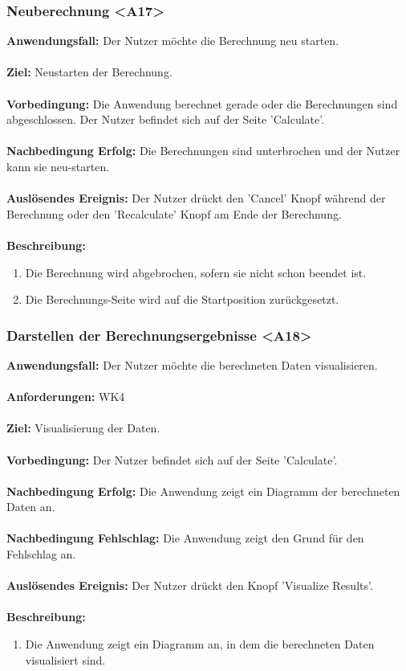 \documentclass[parskip=full]{scrartcl} %
\begin{document}
\subsubsection*{Neuberechnung <A17>}
\textbf{Anwendungsfall:}  Der Nutzer möchte die Berechnung neu starten.\\\\
\textbf{Ziel:} Neustarten der Berechnung.\\\\
\textbf{Vorbedingung:} Die Anwendung berechnet gerade oder die Berechnungen sind abgeschlossen. Der Nutzer befindet sich auf der Seite 'Calculate'.\\\\
\textbf{Nachbedingung Erfolg:} Die Berechnungen sind unterbrochen und der Nutzer kann sie neu-starten.\\\\
\textbf{Auslösendes Ereignis:} Der Nutzer drückt den 'Cancel' Knopf während der Berechnung oder den 'Recalculate' Knopf am Ende der Berechnung.\\\\
\textbf{Beschreibung:}
\begin{enumerate}
    \item Die Berechnung wird abgebrochen, sofern sie nicht schon beendet ist.
    \item Die Berechnungs-Seite wird auf die Startposition zurückgesetzt.
\end{enumerate}
\newpage



\subsubsection*{Darstellen der Berechnungsergebnisse <A18>}
\textbf{Anwendungsfall:} Der Nutzer möchte die berechneten Daten visualisieren.\\\\
\textbf{Anforderungen:} WK4\\\\
\textbf{Ziel:} Visualisierung der Daten.\\\\
\textbf{Vorbedingung:}  Der Nutzer befindet sich auf der Seite 'Calculate'.\\\\
\textbf{Nachbedingung Erfolg:} Die Anwendung zeigt ein Diagramm der berechneten Daten an.\\\\
\textbf{Nachbedingung Fehlschlag:} Die Anwendung zeigt den Grund für den Fehlschlag an.\\\\
\textbf{Auslösendes Ereignis:} Der Nutzer drückt den Knopf 'Visualize Results'.\\\\
\textbf{Beschreibung:}
\begin{enumerate}
    \item Die Anwendung zeigt ein Diagramm an, in dem die berechneten Daten visualisiert sind.
\end{enumerate}
\newpage
\end{document}
